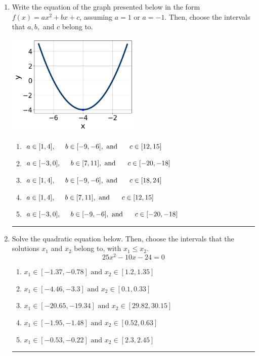 \documentclass[14pt]{extbook}
\newcommand{\litem}[1]{\item#1\hspace*{-1cm}\rule{\textwidth}{0.4pt}}
\begin{document}
\begin{enumerate}
{\begin{enumerate}[label=\Alph*.]
\end{enumerate} }
\litem{
Write the equation of the graph presented below in the form $f(x)=ax^2+bx+c$, assuming  $a=1$ or $a=-1$. Then, choose the intervals that $a, b,$ and $c$ belong to.
\begin{center}
    \includegraphics[width=0.5\textwidth]{../Figures/quadraticGraphToEquationCopyC.png}
\end{center}
\begin{enumerate}[label=\Alph*.]
\item \( a \in [1, 4], \hspace*{5mm} b \in [-9, -6], \text{ and } \hspace*{5mm} c \in [12, 15] \)
\item \( a \in [-3, 0], \hspace*{5mm} b \in [7, 11], \text{ and } \hspace*{5mm} c \in [-20, -18] \)
\item \( a \in [1, 4], \hspace*{5mm} b \in [-9, -6], \text{ and } \hspace*{5mm} c \in [18, 24] \)
\item \( a \in [1, 4], \hspace*{5mm} b \in [7, 11], \text{ and } \hspace*{5mm} c \in [12, 15] \)
\item \( a \in [-3, 0], \hspace*{5mm} b \in [-9, -6], \text{ and } \hspace*{5mm} c \in [-20, -18] \)

\end{enumerate} }
\litem{
Solve the quadratic equation below. Then, choose the intervals that the solutions $x_1$ and $x_2$ belong to, with $x_1 \leq x_2$.\[ 25x^{2} -10 x -24 = 0 \]\begin{enumerate}[label=\Alph*.]
\item \( x_1 \in [-1.37, -0.78] \text{ and } x_2 \in [1.2, 1.35] \)
\item \( x_1 \in [-4.46, -3.3] \text{ and } x_2 \in [0.1, 0.33] \)
\item \( x_1 \in [-20.65, -19.34] \text{ and } x_2 \in [29.82, 30.15] \)
\item \( x_1 \in [-1.95, -1.48] \text{ and } x_2 \in [0.52, 0.63] \)
\item \( x_1 \in [-0.53, -0.22] \text{ and } x_2 \in [2.3, 2.45] \)


\end{enumerate}}
\end{enumerate}
\end{document}
